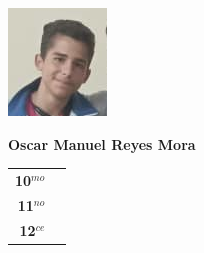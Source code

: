\begin{minipage}{0.2\textwidth}
	\includegraphics[width=\linewidth]{img/concursantes/oscar.png} %
\end{minipage}
\hfill
\begin{minipage}{0.7\textwidth}
	\textbf{Oscar Manuel Reyes Mora}
	
	\vspace*{0.1in}
	\begin{tabular}{rl}
		
		\textbf{10$^{mo}$} &   \\
		
		\textbf{11$^{no}$} &  \\
		
		\textbf{12$^{ce}$} &   \\
		
		
	\end{tabular}
\end{minipage}

